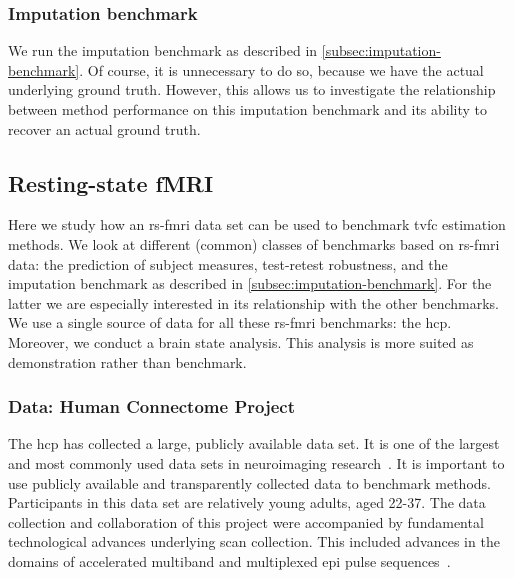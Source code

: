 \subsubsection{Imputation benchmark}

We run the imputation benchmark as described in \cref{subsec:imputation-benchmark}.
Of course, it is unnecessary to do so, because we have the actual underlying ground truth.
However, this allows us to investigate the relationship between method performance on this imputation benchmark and its ability to recover an actual ground truth.

\subsection{Resting-state fMRI}

Here we study how an \gls{rs-fmri} data set can be used to benchmark \gls{tvfc} estimation methods.
We look at different (common) classes of benchmarks based on \gls{rs-fmri} data: the prediction of subject measures, test-retest robustness, and the imputation benchmark as described in \cref{subsec:imputation-benchmark}.
For the latter we are especially interested in its relationship with the other benchmarks.
We use a single source of data for all these \gls{rs-fmri} benchmarks: the \gls{hcp}.
Moreover, we conduct a brain state analysis.
This analysis is more suited as demonstration rather than benchmark.

\subsubsection{Data: Human Connectome Project}
\label{subsec:data-hcp}

The \gls{hcp} has collected a large, publicly available data set.
It is one of the largest and most commonly used data sets in neuroimaging research~\parencite{VanEssen2012, VanEssen2013, Elam2021}.
It is important to use publicly available and transparently collected data to benchmark methods.
Participants in this data set are relatively young adults, aged 22-37.
The data collection and collaboration of this project were accompanied by fundamental technological advances underlying scan collection.
This included advances in the domains of accelerated multiband and multiplexed \gls{epi} pulse sequences~\parencite{Moeller2010, Feinberg2010, Setsompop2012, Xu2012}.

